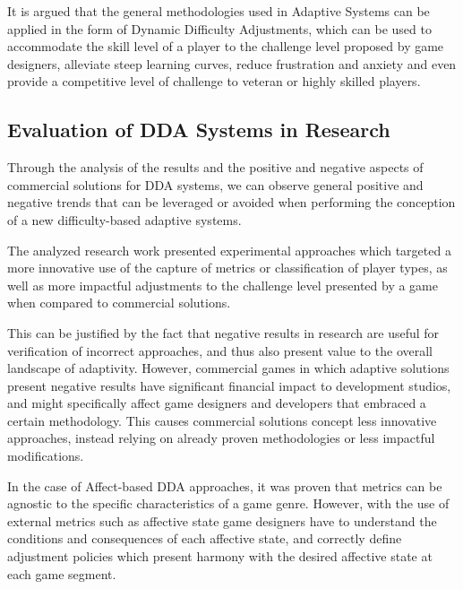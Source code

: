 It is argued that the general methodologies used in Adaptive Systems can be applied in the form of Dynamic Difficulty Adjustments, which can be used to accommodate the skill level of a player to the challenge level proposed by game designers, alleviate steep learning curves, reduce frustration and anxiety and even provide a competitive level of challenge to veteran or highly skilled players.

\subsection{Evaluation of DDA Systems in Research}


Through the analysis of the results and the positive and negative aspects of commercial solutions for DDA systems, we can observe general positive and negative trends that can be leveraged or avoided when performing the conception of a new difficulty-based adaptive systems.

The analyzed research work presented experimental approaches which targeted a more innovative use of the capture of metrics or classification of player types, as well as more impactful adjustments to the challenge level presented by a game when compared to commercial solutions.

This can be justified by the fact that negative results in research are useful for verification of incorrect approaches, and thus also present value to the overall landscape of adaptivity. However, commercial games in which adaptive solutions present negative results have significant financial impact to development studios, and might specifically affect game designers and developers that embraced a certain methodology. This causes commercial solutions concept less innovative approaches, instead relying on already proven methodologies or less impactful modifications.

In the case of Affect-based DDA approaches, it was proven that metrics can be agnostic to the specific characteristics of a game genre. However, with the use of external metrics such as affective state game designers  have to understand the conditions and consequences of each affective state, and correctly define adjustment policies which present harmony with the desired affective state at each game segment.

